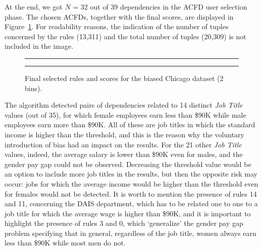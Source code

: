 \begin{itemize}
At the end, we got \(N\) = 32 out of 39 dependencies in the ACFD user selection phase. The chosen ACFDs, together with the final scores, are displayed in Figure~\ref{fig:chicago_biased_fair-db}. For readability reasons, the indication of the number of tuples concerned by the rules (13,311) and the total number of tuples (20,309) is not included in the image.

\begin{figure}[t!]
\centering
\noindent\rule{\linewidth}{0.4pt}\par
\end{figure}
\begin{figure}[t!]
\ContinuedFloat
\centering
\noindent\rule{\linewidth}{0.4pt}
\caption{Final selected rules and scores for the biased Chicago dataset (2 bins).}
\label{fig:chicago_biased_fair-db}
\end{figure}

The algorithm detected pairs of dependencies related to 14 distinct \textit{Job Title} values (out of 35), for which female employees earn less than \$90K while male employees earn more than \$90K. All of these are job titles in which the standard income is higher than the threshold, and this is the reason why the voluntary introduction of bias had an impact on the results. For the 21 other \textit{Job Title} values, indeed, the average salary is lower than \$90K even for males, and the gender pay gap could not be observed. Decreasing the threshold value would be an option to include more job titles in the results, but then the opposite risk may occur: jobs for which the average income would be higher than the threshold even for females would not be detected. It is worth to mention the presence of rules 14 and 11, concerning the DAIS department, which has to be related one to one to a job title for which the average wage is higher than \$90K, and it is important to highlight the presence of rules 3 and 0, which `generalize' the gender pay gap problem specifying that in general, regardless of the job title, women always earn less than \$90K while most men do not.


\end{itemize}
